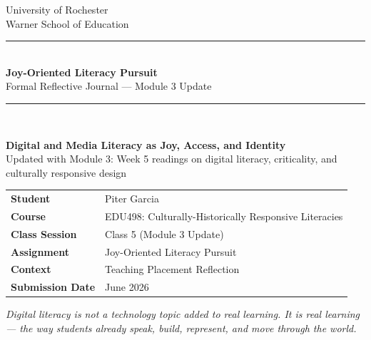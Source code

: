 \documentclass[12pt]{article}
\begin{document}
\begin{titlepage}
\thispagestyle{empty}

\begin{center}
    \vspace*{0.25in}
    {\large University of Rochester\\}
    {\normalsize Warner School of Education\\[0.35in]}

    {\color{PrimaryRed}\rule{\textwidth}{1.4pt}}\\[0.22in]
    {\Huge\bfseries Joy-Oriented Literacy Pursuit\\[0.12in]}
    {\Large Formal Reflective Journal --- Module 3 Update\\[0.22in]}
    {\color{PrimaryRed}\rule{0.72\textwidth}{0.7pt}}\\[0.32in]

    \colorbox{SoftBlue}{%
        \parbox{0.86\textwidth}{%
            \centering\vspace{0.12in}
            \textbf{Digital and Media Literacy as Joy, Access, and Identity}\\[0.05in]
            Updated with Module 3: Week 5 readings on digital literacy, criticality, and culturally responsive design
            \vspace{0.12in}
        }%
    }
\end{center}

\vspace{0.75in}

\begin{center}
\renewcommand{\arraystretch}{1.35}
\begin{tabular}{>{\bfseries\RaggedLeft}p{1.55in} p{4.85in}}
Student & Piter Garcia \\
Course & EDU498: Culturally-Historically Responsive Literacies \\
Class Session & Class 5 (Module 3 Update) \\
Assignment & Joy-Oriented Literacy Pursuit \\
Context & Teaching Placement Reflection \\
Submission Date & June 2026 \\
\end{tabular}
\end{center}

\vfill

\begin{center}
\begin{minipage}{0.78\textwidth}
\centering
\itshape
Digital literacy is not a technology topic added to real learning. It is real learning --- the way students already speak, build, represent, and move through the world.
\end{minipage}
\end{center}

\restoregeometry
\end{titlepage}
\clearpage
\end{document}

